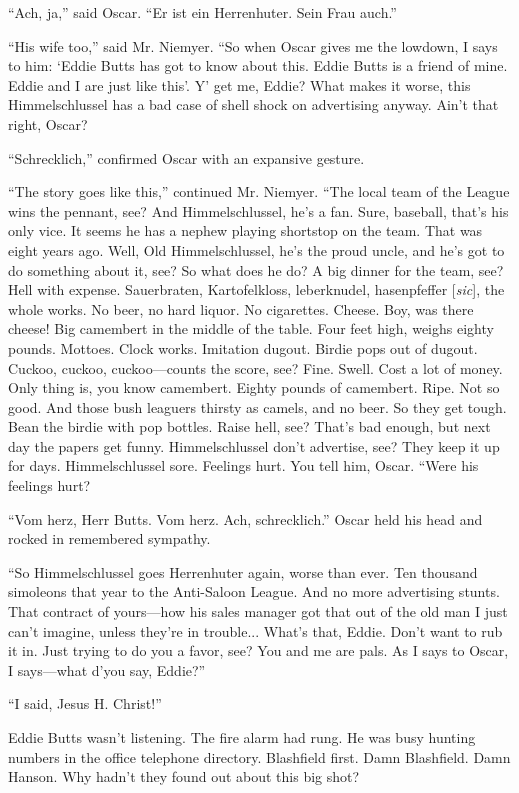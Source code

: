 \documentclass[nohyper,openany,nobib]{tufte-book}
\begin{document}
``Ach, ja,'' said Oscar. ``Er ist ein Herrenhuter. Sein Frau auch.''

``His wife too,'' said Mr. Niemyer. ``So when Oscar gives me the
lowdown, I says to him: `Eddie Butts has got to know about this. Eddie
Butts is a friend of mine. Eddie and I are just like this'. Y' get me,
Eddie? What makes it worse, this Himmelschlussel has a bad case of shell
shock on advertising anyway. Ain't that right, Oscar?

``Schrecklich,'' confirmed Oscar with an expansive gesture.

``The story goes like this,'' continued Mr. Niemyer. ``The local team of
the League wins the pennant, see? And Himmelschlussel, he's a fan. Sure,
baseball, that's his only vice. It seems he has a nephew playing
shortstop on the team. That was eight years ago. Well, Old
Himmelschlussel, he's the proud uncle, and he's got to do something
about it, see? So what does he do? A big dinner for the team, see? Hell
with expense. Sauerbraten, Kartofelkloss, leberknudel, hasenpfeffer [\emph{sic}], the
whole works. No beer, no hard liquor. No cigarettes. Cheese. Boy, was
there cheese! Big camembert in the middle of the table. Four feet high,
weighs eighty pounds. Mottoes. Clock works. Imitation dugout. Birdie
pops out of dugout. Cuckoo, cuckoo, cuckoo---counts the score, see?
Fine. Swell. Cost a lot of money. Only thing is, you know camembert.
Eighty pounds of camembert. Ripe. Not so good. And those bush leaguers
thirsty as camels, and no beer. So they get tough. Bean the birdie with
pop bottles. Raise hell, see? That's bad enough, but next day the papers
get funny. Himmelschlussel don't advertise, see? They keep it up for
days. Himmelschlussel sore. Feelings hurt. You tell him, Oscar. ``Were
his feelings hurt?

``Vom herz, Herr Butts. Vom herz. Ach, schrecklich.'' Oscar held his
head and rocked in remembered sympathy.

``So Himmelschlussel goes Herrenhuter again, worse than ever. Ten
thousand simoleons that year to the Anti-Saloon League. And no more
advertising stunts. That contract of yours---how his sales manager got
that out of the old man I just can't imagine, unless they're in
trouble... What's that, Eddie. Don't want to rub it in. Just trying to
do you a favor, see? You and me are pals. As I says to Oscar, I
says---what d'you say, Eddie?''

``I said, Jesus H. Christ!''

Eddie Butts wasn't listening. The fire alarm had rung. He was busy
hunting numbers in the office telephone directory. Blashfield first.
Damn Blashfield. Damn Hanson. Why hadn't they found out about this big
shot?
\end{document}
